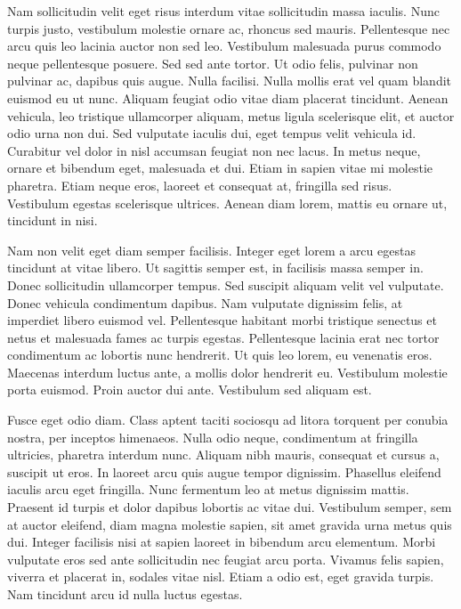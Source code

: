 \documentclass{EPUProjetDi}
\begin{document}
Nam sollicitudin velit eget risus interdum vitae sollicitudin massa iaculis. Nunc turpis justo, vestibulum molestie ornare ac, rhoncus sed mauris. Pellentesque nec arcu quis leo lacinia auctor non sed leo. Vestibulum malesuada purus commodo neque pellentesque posuere. Sed sed ante tortor. Ut odio felis, pulvinar non pulvinar ac, dapibus quis augue. Nulla facilisi. Nulla mollis erat vel quam blandit euismod eu ut nunc. Aliquam feugiat odio vitae diam placerat tincidunt. Aenean vehicula, leo tristique ullamcorper aliquam, metus ligula scelerisque elit, et auctor odio urna non dui. Sed vulputate iaculis dui, eget tempus velit vehicula id. Curabitur vel dolor in nisl accumsan feugiat non nec lacus. In metus neque, ornare et bibendum eget, malesuada et dui. Etiam in sapien vitae mi molestie pharetra. Etiam neque eros, laoreet et consequat at, fringilla sed risus. Vestibulum egestas scelerisque ultrices. Aenean diam lorem, mattis eu ornare ut, tincidunt in nisi.

Nam non velit eget diam semper facilisis. Integer eget lorem a arcu egestas tincidunt at vitae libero. Ut sagittis semper est, in facilisis massa semper in. Donec sollicitudin ullamcorper tempus. Sed suscipit aliquam velit vel vulputate. Donec vehicula condimentum dapibus. Nam vulputate dignissim felis, at imperdiet libero euismod vel. Pellentesque habitant morbi tristique senectus et netus et malesuada fames ac turpis egestas. Pellentesque lacinia erat nec tortor condimentum ac lobortis nunc hendrerit. Ut quis leo lorem, eu venenatis eros. Maecenas interdum luctus ante, a mollis dolor hendrerit eu. Vestibulum molestie porta euismod. Proin auctor dui ante. Vestibulum sed aliquam est.

Fusce eget odio diam. Class aptent taciti sociosqu ad litora torquent per conubia nostra, per inceptos himenaeos. Nulla odio neque, condimentum at fringilla ultricies, pharetra interdum nunc. Aliquam nibh mauris, consequat et cursus a, suscipit ut eros. In laoreet arcu quis augue tempor dignissim. Phasellus eleifend iaculis arcu eget fringilla. Nunc fermentum leo at metus dignissim mattis. Praesent id turpis et dolor dapibus lobortis ac vitae dui. Vestibulum semper, sem at auctor eleifend, diam magna molestie sapien, sit amet gravida urna metus quis dui. Integer facilisis nisi at sapien laoreet in bibendum arcu elementum. Morbi vulputate eros sed ante sollicitudin nec feugiat arcu porta. Vivamus felis sapien, viverra et placerat in, sodales vitae nisl. Etiam a odio est, eget gravida turpis. Nam tincidunt arcu id nulla luctus egestas.
\end{document}
